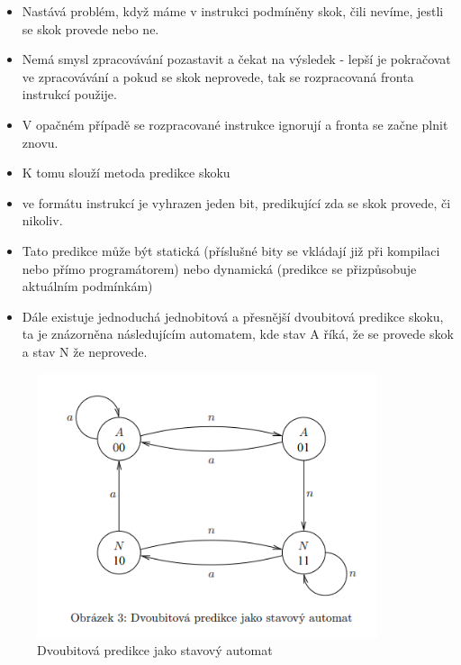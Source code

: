 \documentclass[10pt,a4paper]{article}
\begin{document}
\begin{itemize}
\item Nastává problém, když máme v instrukci podmíněny skok, čili nevíme, jestli se skok provede nebo ne.
\item Nemá smysl zpracovávání pozastavit a čekat na výsledek - lepší je pokračovat ve zpracovávání a pokud se skok neprovede, tak se rozpracovaná fronta instrukcí použije.
\item V opačném případě se rozpracované instrukce ignorují a fronta se začne plnit znovu.
\item K tomu slouží metoda predikce skoku
\item ve formátu instrukcí je vyhrazen jeden bit, predikující zda se skok provede, či nikoliv.
\item Tato predikce může být statická (příslušné bity se vkládají již při kompilaci nebo přímo programátorem) nebo dynamická (predikce se přizpůsobuje aktuálním podmínkám)
\item Dále existuje jednoduchá jednobitová a přesnější dvoubitová predikce skoku, ta je znázorněna následujícím automatem, kde stav A říká, že se provede skok a stav N že neprovede.
\end{itemize}
\begin{figure}[ht]
    \centering
    \includegraphics[width=10cm]{predikce.png}
    \caption{Dvoubitová predikce jako stavový automat}
    \label{fig:predikce}
\end{figure}
\end{document}
